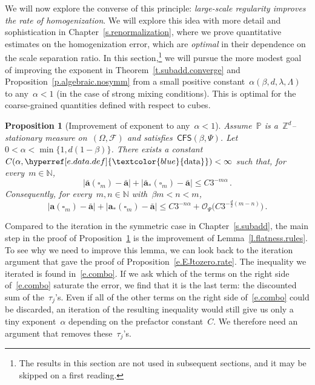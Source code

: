 \documentclass[11pt,twoside]{article} %
\let\oldsquare\square %
\renewcommand{\square}{\oldsquare}
\numberwithin{equation}{section}
\newtheorem{proposition}[theorem]{Proposition}
\theoremstyle{definition}
\newcommand{\dataref}{\hyperref[e.data.def]{\textcolor{blue}{\ensuremath{\mathrm{data}}}}}
\newcommand*{\N}{\ensuremath{\mathbb{N}}}
\newcommand*{\Zd}{\ensuremath{\mathbb{Z}^d}}
\renewcommand{\a}{\mathbf{a}}
\newcommand{\ahom}{\bar{\a}}
\newcommand{\cu}{\square}
\newcommand{\F}{\mathcal{F}}
\renewcommand{\P}{\mathbb{P}}
\renewcommand{\O}{\mathcal{O}}
\newcommand{\CFS}{\mathsf{CFS}}
\begin{document}
We will now explore the converse of this principle: \emph{large-scale regularity improves the rate of homogenization}. We will explore this idea with more detail and sophistication in Chapter~\ref{s.renormalization}, where we prove quantitative estimates on the homogenization error, which are \emph{optimal} in their dependence on the scale separation ratio.
In this section,\footnote{The results in this section are not used in subsequent sections, and it may be skipped on a first reading.} we will pursue the more modest goal of improving the exponent in Theorem~\ref{t.subadd.converge} and Proposition~\ref{p.algebraic.nosymm} from a small positive constant~$\alpha(\beta,d,\lambda,\Lambda)$ to any~$\alpha<1$ (in the case of strong mixing conditions). This is optimal for the coarse-grained quantities defined with respect to cubes. 

\begin{proposition}[{Improvement of exponent to any~$\alpha<1$}]
\label{p.alpha.almostone}
Assume~$\P$ is a~$\Zd$--stationary measure on~$(\Omega,\F)$ and satisfies~$\CFS(\beta,\Psi)$. 
Let~$0 < \alpha < \min\{ 1, d(1-\beta) \}$. 
There exists a constant~$C(\alpha,\dataref)<\infty$
such that, for every~$m \in\N$,
\begin{equation}
\label{e.improvedEconv}
| \ahom(\cu_m) - \ahom | 
+
|\ahom_*(\cu_m) - \ahom |
\leq 
C 3^{-m \alpha} \,.
\end{equation}
Consequently, for every~$m,n\in\N$ with~$\beta m < n < m$, 
\begin{equation}
\label{e.aastar.big.smash.improved}
| \a(\cu_m) - \ahom |
+
|\a_*(\cu_m) - \ahom |
\leq 
C 3^{-n \alpha}
+ 
\O_\Psi \bigl( C3^{-\frac d2(m-n)} \bigr) 
\,.
\end{equation}
\end{proposition}

Compared to the iteration in the symmetric case in Chapter~\ref{s.subadd}, the main step in the proof of Proposition~\ref{p.alpha.almostone} is the improvement of Lemma~\ref{l.flatness.rules}. To see why we need to improve this lemma, we can look back to the iteration argument that gave the proof of Proposition~\ref{e.EJtozero.rate}. The inequality we iterated is found in~\eqref{e.combo}. If we ask which of the terms on the right side of~\eqref{e.combo} saturate the error, we find that it is the last term: the discounted sum of the~$\tau_j$'s. Even if all of the other terms on the right side of~\eqref{e.combo} could be discarded, an iteration of the resulting inequality would still give us only a tiny exponent~$\alpha$ depending on the prefactor constant~$C$. We therefore need an argument that removes these~$\tau_j$'s. 
\end{document}

